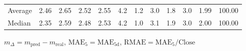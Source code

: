 \begin{threeparttable}
{\begin{tabular}{lrrrrrrrrrrr}
Average &          2.46 &          2.65 &          2.52 &        2.55 &                 4.2 &                 1.2 &        3.0 &                 1.8 &              3.0 &            1.99 &                 100.00 \\
 Median &          2.35 &          2.59 &          2.48 &        2.53 &                 4.2 &                 1.0 &        3.1 &                 1.9 &              3.0 &            2.00 &                 100.00 \\
\bottomrule
\end{tabular}
}
\begin{tablenotes}\footnotesize
\item $m_\Delta=m_{\text{pred}}-m_{\text{real}}$,
$\mathrm{MAE}_5=\mathrm{MAE}_{5\text{d}}$,
$\mathrm{RMAE}=\mathrm{MAE}_5/\text{Close}$
\end{tablenotes}
\end{threeparttable}
\endgroup


